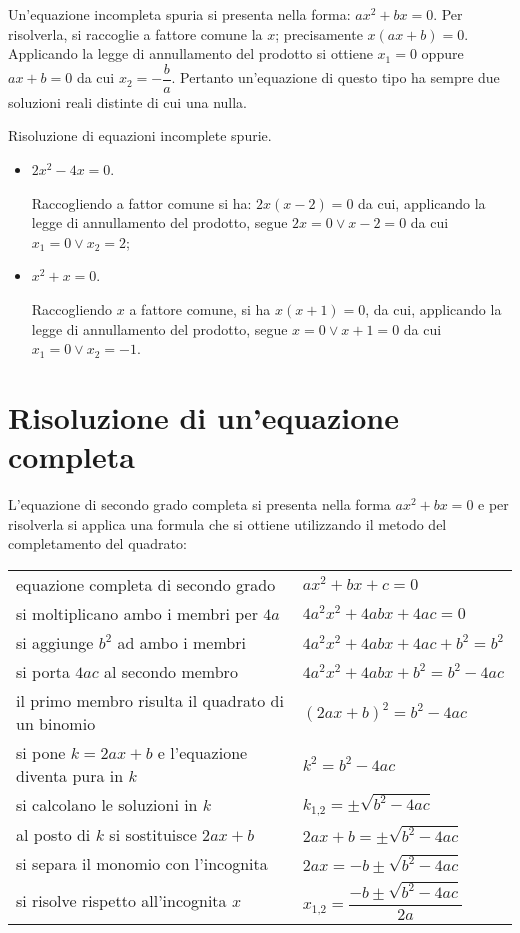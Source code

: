 Un'equazione incompleta spuria si presenta nella forma: $a x ^{2} + b x = 0$.
Per risolverla, si raccoglie a fattore comune la
$x$; precisamente $x ( a x + b ) = 0$.
Applicando la legge di annullamento del prodotto si ottiene
$x_{1} = 0$ oppure $ax + b = 0$ da cui $x_{2} = - \dfrac{b}{a}$.
Pertanto un'equazione di questo tipo ha sempre due soluzioni reali distinte di cui una nulla.
\begin{exrig}
\begin{esempio}
Risoluzione di equazioni incomplete spurie.
\begin{itemize}
\item $2 x^{2} - 4 x = 0$.

Raccogliendo a fattor comune si ha: $2 x ( x - 2 ) = 0$ da cui, applicando la legge di annullamento del prodotto, segue $2x = 0 \vee x - 2 = 0$ da cui $x_{1} = 0 \vee x_{2} = 2$;
\item $x ^{2 } + x = 0$.

Raccogliendo $x$ a fattore comune, si ha $x ( x + 1 ) = 0$, da cui, applicando la legge di annullamento del prodotto, segue $x = 0 \vee x + 1 = 0$ da cui $x_{1} = 0 \vee x_{2} = - 1$.
\end{itemize}
\end{esempio}
\end{exrig}
\vspazio\ovalbox{\risolvii \ref{ese:3.5}, \ref{ese:3.6}, \ref{ese:3.7}, \ref{ese:3.8}, \ref{ese:3.9}, \ref{ese:3.10}, \ref{ese:3.11}}

\section{Risoluzione di un'equazione completa}

L'equazione di secondo grado completa si presenta nella forma $a x ^{2} + b x = 0$ e per risolverla si applica una formula che si ottiene utilizzando il metodo del completamento del quadrato:

\begin{tabular}{ll}
equazione completa di secondo grado & $a x^{2} + b x + c=0$\\
si moltiplicano ambo i membri per $4a$ & $4 a^{2} x^{2} + 4 a b x + 4 a c=0$\\
si aggiunge $b^{2}$ ad ambo i membri & $4 a^{2} x^{2} + 4 a b x + 4 a c + b^{2}=b^{2}$\\
si porta $4ac$ al secondo membro & $4 a^{2} x^{2} + 4 a b x + b^{2}=b^{2} - 4 a c$\\
il primo membro risulta il quadrato di un binomio & $( 2 a x + b )^{2}=b^{2} - 4 a c$\\
si pone $k=2ax + b$ e l'equazione diventa pura in $k$ & $k^{2}=b^{2} - 4 a c$\\
si calcolano le soluzioni in $k$ & $k_{1\text{,}2}=\pm \sqrt{b^{2} - 4 a c}$\\
al posto di $k$ si sostituisce $2ax + b$ & $2 a x + b=\pm \sqrt{b^{2} - 4 a c}$\\
si separa il monomio con l'incognita & $2 a x=- b \pm \sqrt{b^{2} - 4 a c}$\\
si risolve rispetto all'incognita $x$ & $x_{1\text{,}2}=\dfrac{- b \pm \sqrt{b^{2} - 4 a c}}{2 a}$\\
\end{tabular}

